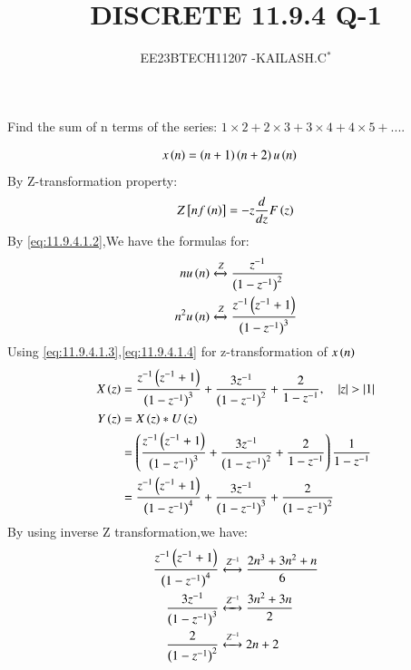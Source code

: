 \documentclass[journal,12pt,twocolumn]{IEEEtran}
\theoremstyle{remark}
\begin{document}

\vspace{3cm}

\title{DISCRETE 11.9.4 Q-1}
\author{EE23BTECH11207 -KAILASH.C$^{*}$%
}
\maketitle
\newpage
\bigskip

\renewcommand{\thefigure}{\theenumi}
\renewcommand{\thetable}{\theenumi}


Find the sum of n terms of the series:
$1\times2+2\times3+3\times4+4\times5+....$\\
\solution
\fi

\begin{align}
 x\left(n\right)&=\left(n+1\right)\left(n+2\right)u\left(n\right)\label{eq:11.9.4.1.1}
\end{align}
By Z-transformation property:
\begin{align}
Z{}\left[nf\left(n\right)\right]=-z\frac{d}{dz}F\left(z\right)\label{eq:11.9.4.1.2}
\end{align}
By \eqref{eq:11.9.4.1.2},We have the formulas for:
\begin{align}
nu\left(n\right)&\xleftrightarrow[]{Z} \frac{z^{-1}}{\left(1-z^{-1}\right)^2}\label{eq:11.9.4.1.3}\\
n^2u\left(n\right)&\xleftrightarrow[]{Z}\frac{z^{-1}\left(z^{-1}+1\right)}{\left(1-z^{-1}\right)^3}\label{eq:11.9.4.1.4}
\end{align}
Using \eqref{eq:11.9.4.1.3},\eqref{eq:11.9.4.1.4} for z-transformation of $x\left(n\right)$
\begin{align}
    X\left(z\right)&=\frac{z^{-1}\left(z^{-1}+1\right)}{\left(1-z^{-1}\right)^3}+\frac{3z^{-1}}{\left(1-z^{-1}\right)^2}+\frac{2}{1-z^{-1}},\quad\left\vert z\right\vert>\left\vert1\right\vert\label{eq:11.9.4.1.5}\\
    Y\left(z\right)&=X\left(z\right)*U\left(z\right)\label{eq:11.9.4.1.6}\\
   &=\left(\frac{z^{-1}\left(z^{-1}+1\right)}{\left(1-z^{-1}\right)^3}+\frac{3z^{-1}}{\left(1-z^{-1}\right)^2}+\frac{2}{1-z^{-1}}\right)\frac{1}{1-z^{-1}}\label{eq:11.9.4.1.7}\\
   &=\frac{z^{-1}\left(z^{-1}+1\right)}{\left(1-z^{-1}\right)^4}+\frac{3z^{-1}}{\left(1-z^{-1}\right)^3}+\frac{2}{\left(1-z^{-1}\right)^2}\label{eq:11.9.4.1.8}
\end{align}
By using inverse Z transformation,we have:
\begin{align}
    \frac{z^{-1}\left(z^{-1}+1\right)}{\left(1-z^{-1}\right)^4}&\xleftrightarrow[]{Z^{-1}} \frac{2n^3+3n^2+n}{6}\label{eq:11.9.4.1.9}\\
    \frac{3z^{-1}}{\left(1-z^{-1}\right)^3}&\xleftrightarrow[]{Z^{-1}} \frac{3n^2+3n}{2}\label{eq:11.9.4.1.10}\\
    \frac{2}{\left(1-z^{-1}\right)^2}&\xleftrightarrow[]{Z^{-1}} 2n+2\label{eq:11.9.4.1.11}
\end{align}
\end{document}
